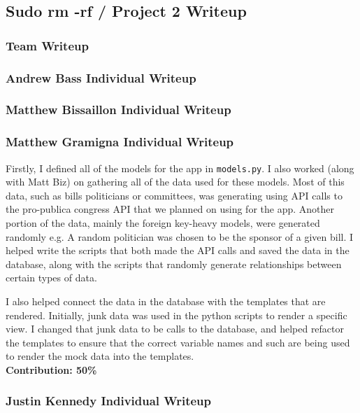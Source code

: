 \documentclass{article}
\begin{document}
\begin{center}
\subsection*{Sudo rm -rf / Project 2 Writeup}
\end{center}

\subsubsection*{Team Writeup}

\pagebreak

\subsubsection*{Andrew Bass Individual Writeup}

\pagebreak

\subsubsection*{Matthew Bissaillon Individual Writeup}

\pagebreak

\subsubsection*{Matthew Gramigna Individual Writeup}

Firstly, I defined all of the models for the app in \verb|models.py|. I also worked (along with Matt Biz) on gathering all of the data used for these models. Most of this data, such as bills politicians or committees, was generating using API calls to the pro-publica congress API that we planned on using for the app.  Another portion of the data, mainly the foreign key-heavy models, were generated randomly e.g. A random politician was chosen to be the sponsor of a given bill. I helped write the scripts that both made the API calls and saved the data in the database, along with the scripts that randomly generate relationships between certain types of data.

I also helped connect the data in the database with the templates that are rendered. Initially, junk data was used in the python scripts to render a specific view. I changed that junk data to be calls to the database, and helped refactor the templates to ensure that the correct variable names and such are being used to render the mock data into the templates. \\

\noindent \textbf{Contribution: 50\%} 

\pagebreak

\subsubsection*{Justin Kennedy Individual Writeup}
\end{document}

